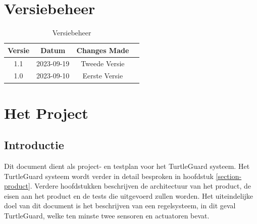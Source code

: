 \documentclass[a4paper]{report}
\newcommand{\turtleguard}{\mbox{TurtleGuard\texttrademark}\xspace}
\begin{document}
\tableofcontents

\chapter*{Versiebeheer}
\thispagestyle{empty}  %
\begin{table}[h]
    \centering
    \begin{tabular}{|c|c|c|p{5cm}|}
        \hline
        Versie & Datum      & Changes Made  \\
        \hline
        1.1    & 2023-09-19 & Tweede Versie \\
        \hline
        1.0    & 2023-09-10 & Eerste Versie \\
        \hline
    \end{tabular}
    \caption{Versiebeheer}
\end{table}
\clearpage  %

\chapter{Het Project}
\section{Introductie}
Dit document dient als project- en testplan voor het \turtleguard systeem. Het \turtleguard systeem wordt verder in detail besproken in hoofdstuk \ref{section-product}.
Verdere hoofdstukken beschrijven de architectuur van het product, de eisen aan het product en de tests die uitgevoerd zullen worden.
Het uiteindelijke doel van dit document is het beschrijven van een regelsysteem, in dit geval \turtleguard, welke ten minste twee sensoren en actuatoren bevat. 
\end{document}
